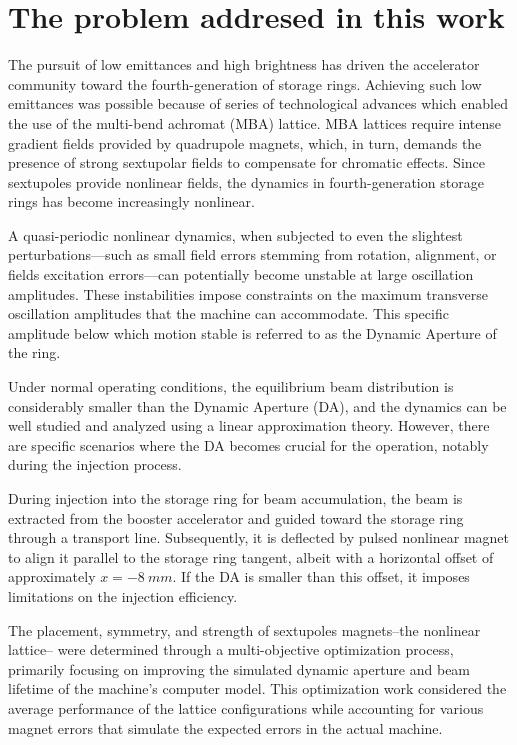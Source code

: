 \section{The problem addresed in this work}
The pursuit of low emittances and high brightness has driven the accelerator community toward the fourth-generation of storage rings. Achieving such low emittances was possible because of series of technological advances which enabled the use of the multi-bend achromat (MBA) lattice\cite{liu_towards_2017,hettel_challenges_2014}. MBA lattices require intense gradient fields provided by quadrupole magnets, which, in turn, demands the presence of strong sextupolar fields to compensate for chromatic effects. Since sextupoles provide nonlinear fields, the dynamics in fourth-generation storage rings has become increasingly nonlinear\cite{liu_towards_2017}.

A quasi-periodic nonlinear dynamics, when subjected to even the slightest perturbations—such as small field errors stemming from rotation, alignment, or fields excitation errors—can potentially become unstable at large oscillation amplitudes. These instabilities impose constraints on the maximum transverse oscillation amplitudes that the machine can accommodate. This specific amplitude below which motion stable is referred to as the Dynamic Aperture of the ring.

Under normal operating conditions, the equilibrium beam distribution is considerably smaller than the Dynamic Aperture (DA), and the dynamics can be well studied and analyzed using a linear approximation theory. However, there are specific scenarios where the DA becomes crucial for the operation, notably during the injection process.

During injection into the storage ring for beam accumulation, the beam is extracted from the booster accelerator and guided toward the storage ring through a transport line. Subsequently, it is deflected by pulsed nonlinear magnet to align it parallel to the storage ring tangent, albeit with a horizontal offset of approximately $x=-8~\unit{mm}$. If the DA is smaller than this offset, it imposes limitations on the injection efficiency.

The placement, symmetry, and strength of sextupoles magnets--the nonlinear lattice-- were determined through a multi-objective optimization process, primarily focusing on improving the simulated dynamic aperture and beam lifetime of the machine's computer model. This optimization work considered the average performance of the lattice configurations while accounting for various magnet errors that simulate the expected errors in the actual machine.

